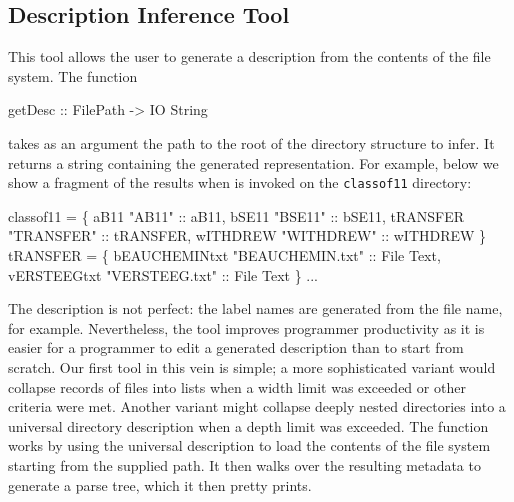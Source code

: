 \subsection{Description Inference Tool}
This tool allows the user to generate a \forest{} description from the
contents of the file system.   The function
\begin{code}
getDesc :: FilePath -> IO String
\end{code}
takes as an argument the path to the root of the directory structure
to infer.  It returns a string containing the generated
representation.  For example, below we show a fragment of the
results when
 is invoked on the \texttt{classof11} directory:
\begin{code}
 classof11 =  \{
    aB11  "AB11" :: aB11,
    bSE11  "BSE11" :: bSE11,
    tRANSFER  "TRANSFER" :: tRANSFER,
    wITHDREW  "WITHDREW" :: wITHDREW \}
 tRANSFER =  \{
    bEAUCHEMINtxt  "BEAUCHEMIN.txt" :: File Text,
    vERSTEEGtxt  "VERSTEEG.txt" :: File Text \}
...
\end{code}
The description is not perfect: the label names are generated 
from the file name, for example.  Nevertheless, the tool improves
programmer productivity as it is
easier for a programmer to edit a generated description than to
start from scratch.   Our first tool in this vein is simple;
a more sophisticated variant would collapse records of files
into lists when a width limit was exceeded or
other criteria were met.  Another variant might
collapse deeply nested directories into a universal directory
description when a depth limit was exceeded.
The  function works by using the universal description to
load the contents of the file system starting from the supplied path.
It then walks over the resulting metadata to generate a \forest{}
parse tree, which it then pretty prints.




